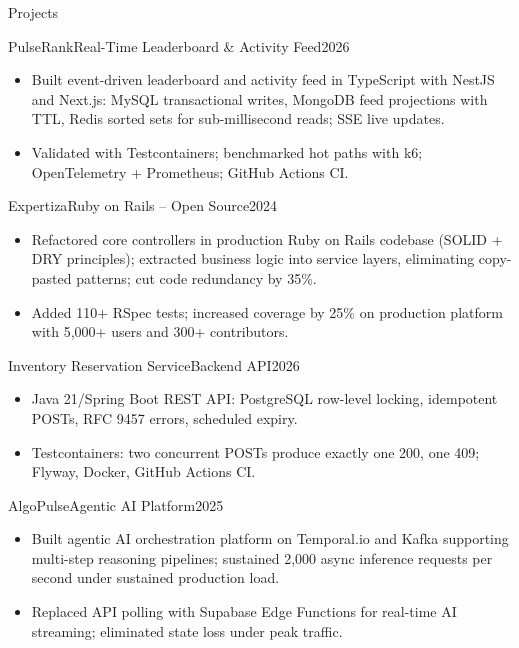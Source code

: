 \documentclass[]{mcdowellcv}
\begin{document}
\begin{cvsection}{Projects}
  \begin{cvsubsection}{PulseRank}{Real-Time Leaderboard \& Activity Feed}{2026}
    \begin{itemize}
      \item Built event-driven leaderboard and activity feed in TypeScript with NestJS and Next.js: MySQL transactional writes, MongoDB feed projections with TTL, Redis sorted sets for sub-millisecond reads; SSE live updates.
      \item Validated with Testcontainers; benchmarked hot paths with k6; OpenTelemetry + Prometheus; GitHub Actions CI.
    \end{itemize}
    \vspace{-1.5pt}
  \end{cvsubsection}

  \begin{cvsubsection}{Expertiza}{Ruby on Rails -- Open Source}{2024}
    \begin{itemize}
      \item Refactored core controllers in production Ruby on Rails codebase (SOLID + DRY principles); extracted business logic into service layers, eliminating copy-pasted patterns; cut code redundancy by 35\%.
      \item Added 110+ RSpec tests; increased coverage by 25\% on production platform with 5,000+ users and 300+ contributors.
    \end{itemize}
    \vspace{-1.5pt}
  \end{cvsubsection}

  \begin{cvsubsection}{Inventory Reservation Service}{Backend API}{2026}
    \begin{itemize}
      \item Java 21/Spring Boot REST API: PostgreSQL row-level locking, idempotent POSTs, RFC 9457 errors, scheduled expiry.
      \item Testcontainers: two concurrent POSTs produce exactly one 200, one 409; Flyway, Docker, GitHub Actions CI.
    \end{itemize}
    \vspace{-1.5pt}
  \end{cvsubsection}

  \begin{cvsubsection}{AlgoPulse}{Agentic AI Platform}{2025}
    \begin{itemize}
      \item Built agentic AI orchestration platform on Temporal.io and Kafka supporting multi-step reasoning pipelines; sustained 2,000 async inference requests per second under sustained production load.
      \item Replaced API polling with Supabase Edge Functions for real-time AI streaming; eliminated state loss under peak traffic.
    \end{itemize}
  \end{cvsubsection}
\end{cvsection}
\end{document}
